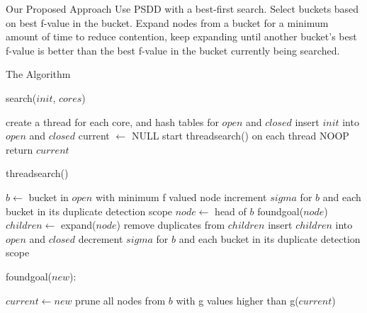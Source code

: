 \documentclass[style=simple]{powerdot}
\begin{document}
\begin{slide}{Our Proposed Approach}
  Use PSDD with a best-first search.  Select buckets based on best
  f-value in the bucket.  Expand nodes from a bucket for a minimum
  amount of time to reduce contention, keep expanding until another
  bucket's best f-value is better than the best f-value in the bucket
  currently being searched.
\end{slide}

\begin{slide}{The Algorithm}
   {
    search($init$, $cores$)
    \begin{algorithmic}[1]
      \STATE create a thread for each core, and hash tables for $open$ and $closed$
      \STATE insert $init$ into $open$ and $closed$
      \STATE current $\leftarrow$ NULL
      \STATE start threadsearch() on each thread
      \STATE NOOP
      \ENDWHILE
      \STATE return $current$
    \end{algorithmic}
  }
   {
    \begin{tiny}
    threadsearch()
    \begin{algorithmic}[1]
      \STATE $b \leftarrow$ bucket in $open$ with minimum f valued node
      \STATE increment $sigma$ for $b$ and each bucket in its duplicate detection scope
      \STATE {}
      \STATE {}
      \STATE {}
      \STATE $node \leftarrow$ head of $b$
      \STATE foundgoal($node$)
      \STATE $children \leftarrow$ expand($node$)
      \STATE remove duplicates from $children$
      \STATE insert $children$ into $open$ and $closed$
      \ENDIF
      \ENDFOR
      \STATE {}
      \STATE decrement $sigma$ for $b$ and each bucket in its duplicate detection scope
      \ENDWHILE
    \end{algorithmic}
    \end{tiny}
  }
   {
    foundgoal($new$):
    \begin{algorithmic}[1]
      \STATE $current \leftarrow new$
      \STATE prune all nodes from $b$ with g values higher than g($current$)
      \ENDIF
    \end{algorithmic}
  }
\end{slide}
\end{document}
